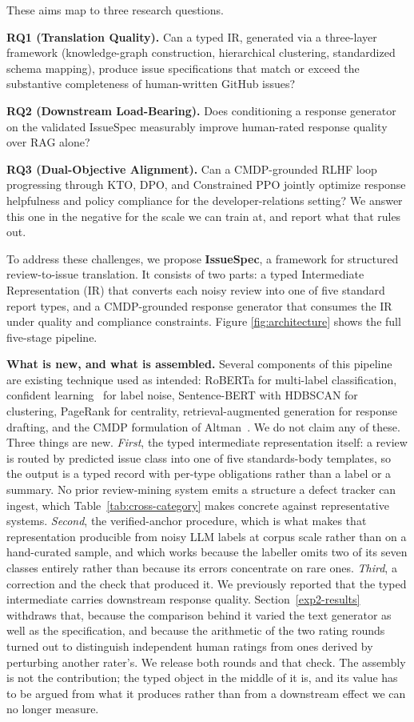 \documentclass[sigconf, anonymous]{acmart}
\begin{document}
These aims map to three research questions.

\textbf{RQ1 (Translation Quality).} Can a typed IR, generated via a three-layer framework (knowledge-graph construction, hierarchical clustering,
standardized schema mapping), produce issue specifications that match or exceed the substantive completeness of human-written GitHub issues?

\textbf{RQ2 (Downstream Load-Bearing).} Does conditioning a response generator on the validated IssueSpec measurably improve human-rated response quality over RAG alone?

\textbf{RQ3 (Dual-Objective Alignment).} Can a CMDP-grounded RLHF loop progressing through KTO, DPO, and Constrained PPO jointly optimize response helpfulness and policy compliance for the
developer-relations setting? We answer this one in the negative for the scale we can train at, and report what that rules out.

To address these challenges, we propose \textbf{IssueSpec}, a framework for structured review-to-issue translation. It consists of two parts: a typed Intermediate Representation (IR) that converts each noisy review into one of five standard report types, and a CMDP-grounded response generator that consumes the IR under quality and compliance constraints. Figure \ref{fig:architecture} shows the full five-stage pipeline.

\textbf{What is new, and what is assembled.} Several components of this pipeline are existing
technique used as intended: RoBERTa for multi-label classification, confident
learning~\cite{northcutt2021confident} for label noise, Sentence-BERT with HDBSCAN for
clustering, PageRank for centrality, retrieval-augmented generation for response drafting, and
the CMDP formulation of Altman~\cite{altman2021constrained}. We do not claim any of these. Three things are
new. \emph{First}, the typed intermediate representation itself: a review is routed by predicted
issue class into one of five standards-body templates, so the output is a typed record with
per-type obligations rather than a label or a summary. No prior review-mining system emits a
structure a defect tracker can ingest, which Table~\ref{tab:cross-category} makes concrete
against representative systems. \emph{Second}, the verified-anchor procedure, which is what makes
that representation producible from noisy LLM labels at corpus scale rather than on a hand-curated
sample, and which works because the labeller omits two of its seven classes entirely rather than because its errors concentrate on rare ones.
\emph{Third}, a correction and the check that produced it. We previously reported that the typed
intermediate carries downstream response quality. Section~\ref{exp2-results} withdraws that,
because the comparison behind it varied the text generator as well as the specification, and
because the arithmetic of the two rating rounds turned out to distinguish independent human
ratings from ones derived by perturbing another rater's. We release both rounds and that check.
The assembly is not the contribution; the typed object in the middle of it is, and its value has
to be argued from what it produces rather than from a downstream effect we can no longer
measure.
\end{document}
